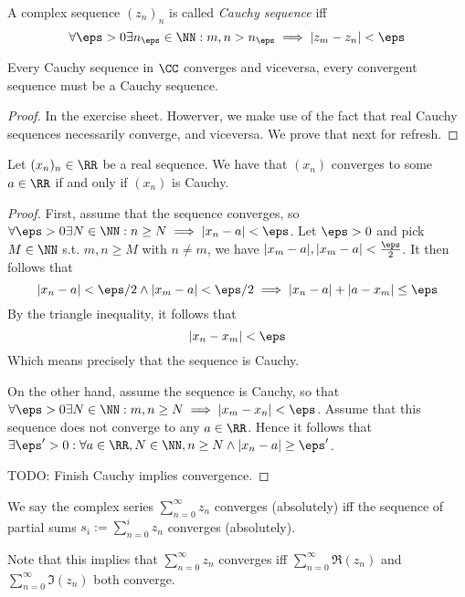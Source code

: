 \begin{definition}
  A complex sequence $(z_n)_n$ is called \emph{Cauchy sequence} iff
  \[\forall \eps>0 \exists n_{\eps}\in\NN : m,n>n_{\eps} \implies |z_m-z_n| <
  \eps\]
  \label{def:complexCauchySeq}
\end{definition}
\begin{proposition}
  Every Cauchy sequence in $\CC$ converges and viceversa, every convergent
  sequence must be a Cauchy sequence.
  \label{prop:cauchyConvergence}
\end{proposition}
\begin{proof}
  In the exercise sheet. Howerver, we make use of the fact that real Cauchy
  sequences necessarily converge, and viceversa. We prove that next for refresh.
\end{proof}
\begin{proposition}
  Let $(x_n)_n\in\RR$ be a real sequence. We have that $(x_n)$ converges to some
  $a\in\RR$ if and only if $(x_n)$ is Cauchy.
  \label{prop:cauchyRealsConverge}
\end{proposition}
\begin{proof}
  First, assume that the sequence converges, so$\forall\eps>0\exists N\in\NN :
  n\geq N \implies |x_n-a|<\eps$. Let $\eps>0$ and pick $M\in\NN$ s.t. $m,n\geq
  M$ with $n\neq m$, we have $|x_m-a|,|x_m-a|<\frac{\eps}{2}$. It then follows
  that 
  \[|x_n-a|<\eps/2 \land |x_m-a|<\eps/2 \implies |x_n-a|+|a-x_m|\leq \eps\]
  By the triangle inequality, it follows that 
  \[|x_n-x_m|< \eps\]
  Which means precisely that the sequence is Cauchy.

  On the other hand, assume the sequence is Cauchy, so that
  $\forall\eps>0\exists N\in\NN : m,n\geq N \implies |x_m-x_n|<\eps$. Assume that
  this sequence does not converge to any $a\in\RR$. Hence it follows that
  $\exists \eps'>0 :\forall a\in\RR, N\in\NN,  n\geq N \land |x_n-a|\geq \eps'$.

  TODO: Finish Cauchy implies convergence.


\end{proof}


\begin{definition}
  We say the complex series $\sum_{n=0}^{\infty} z_n$ converges (absolutely) iff
  the sequence of partial sums $s_i:=\sum_{n=0}^i z_n$ converges (absolutely).
  \label{def:convergenceSeries}
\end{definition}

\begin{remark}
  Note that this implies that $\sum_{n=0}^{\infty}z_n$ converges iff
  $\sum_{n=0}^{\infty}\Re(z_n)$ and $\sum_{n=0}^{\infty}\Im(z_n)$ both converge.
\end{remark}

